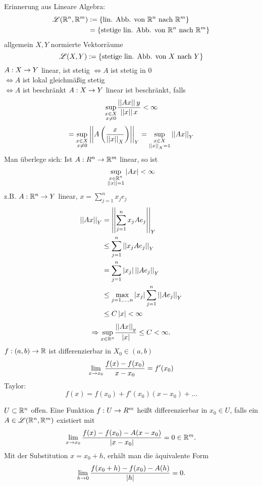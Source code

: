 \documentclass[../ana2.tex]{subfiles}
\begin{document}
Erinnerung aus Lineare Algebra:
\begin{align*}
    \mathscr{L}(\mathbb{R}^n, \mathbb{R}^m) 
    &:= \{\text{lin. Abb. von } \mathbb{R}^n \text{ nach } \mathbb{R}^m\}\\
    &= \{\text{stetige lin. Abb. von } \mathbb{R}^n \text{ nach } \mathbb{R}^m\}
\end{align*}
allgemein \( X, Y \) normierte Vektorräume
\[ \mathscr{L}(X, Y) := 
\{\text{stetige lin. Abb. von } X \text{ nach } Y\}  \]
\( A:X\rightarrow Y \) linear, ist stetig 
\( \Leftrightarrow A \) ist stetig in \(0\) \\
\( \Leftrightarrow A \) ist lokal gleichmäßig stetig \\
\( \Leftrightarrow A \) ist beschränkt
\( A:X\rightarrow Y \) linear ist beschränkt, falls 
\[ \underset{\substack{x\in X\\x \neq 0}}{\sup}
\frac{ \left|\left|Ax\right|\right|y }{\left|\left|x\right|\right|x} < \infty \]
\[ = \underset{\substack{x\in X\\x \neq 0}}{\sup} 
\left|\left| A\left(\frac{x}{\left|\left|x\right|\right|_X}\right) \right|\right|_Y
= \underset{\substack{x\in X\\\left|\left|x\right|\right|_X = 1}}{\sup} 
\left|\left|Ax\right|\right|_Y \]
Man überlege sich: Ist \( A:R^n\rightarrow \mathbb{R}^m \)
linear, so ist
\[ \underset{\substack{x\in \mathbb{R}^n \\ \left|\left|x\right|\right| = 1}}{\sup} \left|Ax\right| < \infty \]
z.B. \( A:\mathbb{R}^n\rightarrow Y \) linear, \(x = \sum_{j=1}^n x_j e_j\)
\begin{align*}
    \left|\left|Ax\right|\right|_Y &= \left|\left|\sum_{j=1}^n x_jAe_j\right|\right|_Y \\
    &\leq \sum_{j=1}^n \left|\left| x_j A e_j \right|\right|_Y \\
    &= \sum_{j=1}^n \left|x_j\right| \left|\left| A e_j \right|\right|_Y \\
    &\leq \underset{j=1,\ldots,n}{\max} \left|x_j\right| \sum_{j=1}^n \left|\left|A e_j\right|\right|_Y\\
    &\leq C \left|x\right| < \infty
\end{align*}
\[ \Rightarrow \underset{x\in\mathbb{R}^n}{\sup} 
\frac{ \left|\left|A x\right|\right|_y }{\left|x\right|} \leq C < \infty. \]
\( f:(a,b)\rightarrow \mathbb{R} \) ist differenzierbar in \( X_0 \in (a,b)\)
\[ \lim\limits_{x\rightarrow{}x_0} \frac{f(x)-f(x_0)}{x-x_0} = f'(x_0) \]
Taylor: \[ f(x) = f(x_0) + f'(x_0)(x - x_0) + \ldots \]
\begin{defi}[Ableitung]
    \( U \subset \mathbb{R}^n \) offen. Eine Funktion \(f:U\rightarrow R^m\)
    heißt differenzierbar in \(x_0 \in U\), falls ein
    \( A \in \mathscr{L}(\mathbb{R}^n, \mathbb{R}^m) \) existiert mit
    \[ \lim\limits_{x\rightarrow{}x_0} \frac{f(x) -f(x_0) - A(x-x_0)}{\left|x-x_0\right|} 
    = 0 \in \mathbb{R}^m. \]
    Mit der Substitution \( x = x_0 + h \), 
    erhält man die äquivalente Form 
    \[ \lim\limits_{h\rightarrow{}0} \frac{ f(x_0 + h) - f(x_0) - A(h) }{\left|h\right|} = 0. \]
\end{defi}
\end{document}
